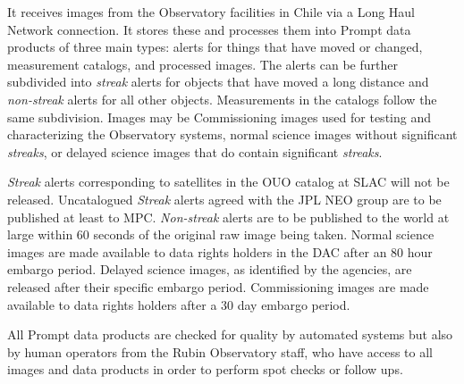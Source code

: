 It receives images from the Observatory facilities in Chile via a Long Haul Network connection.
It stores these and processes them into Prompt data products of three main types:
alerts for things that have moved or changed, measurement catalogs, and processed images.
The alerts can be further subdivided into \emph{streak} alerts for objects that have moved a long distance and \emph{non-streak} alerts for all other objects.
Measurements in the catalogs follow the same subdivision. Images may be \gls{Commissioning} images used for testing and characterizing the Observatory systems, normal science images without significant \emph{streaks}, or delayed science images that do contain significant \emph{streaks}.

\emph{Streak} alerts corresponding to satellites in the \gls{OUO} catalog at \gls{SLAC} will not be released.
Uncatalogued \emph{Streak} alerts agreed with the \gls{JPL} \gls{NEO} group  are to be published at least to \gls{MPC}.
\emph{Non-streak} alerts are to be published to the world at large within 60 seconds of the original raw image being taken.
Normal science images are made available to data rights holders in the \gls{DAC} after an 80 hour embargo period.
Delayed science images, as identified by the agencies, are released after their specific embargo period. \gls{Commissioning} images are made available to data rights holders after a 30 day embargo period.

All Prompt data products are checked for quality by automated systems but also by human operators from the Rubin Observatory staff, who have access to all images and data products in order to perform spot checks or follow ups.

